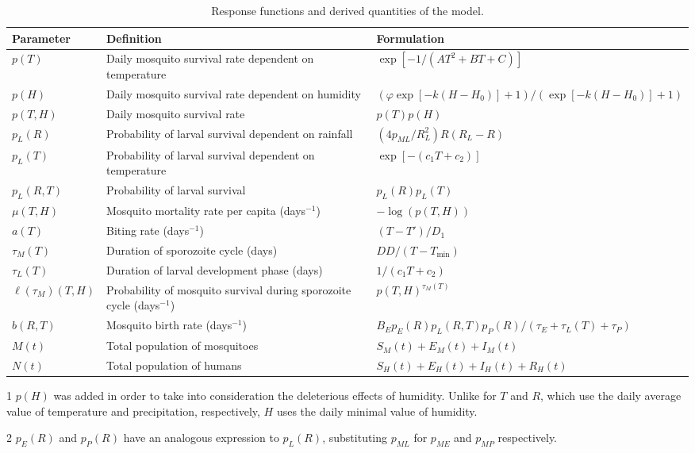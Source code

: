 \documentclass[a4paper,fleqn]{cas-dc}
\begin{document}
\begin{table}[width=2.0\linewidth,cols=3,pos=h]
\begin{threeparttable}
\caption{Response functions and derived quantities of the model.}\label{tbl1}
\renewcommand{\thetable}{A.1}  %
\begin{tabular*}{\tblwidth}{@{} LLL@{} }
\toprule
Parameter & Definition & Formulation\\
\midrule
$p(T)$  & Daily mosquito survival rate dependent on temperature  & $\exp\left[-1 / (AT^2 + BT + C)\right]$ \\  
$p(H)$  & Daily mosquito survival rate dependent on humidity  & $\left(\varphi\exp\left[-k(H-H_0)\right]+1\right)/\left(\exp\left[-k(H-H_0)\right]+1\right)$\\%
$p(T, H)$   & Daily mosquito survival rate   & $p(T)p(H)$ \\  
$p_L(R)$   & Probability of larval survival dependent on rainfall  & $({4p_{ML}}/{R_L^2})R(R_L - R)$  \\  
$p_L(T)$   & Probability of larval survival dependent on temperature   & $\exp\left[-(c_1T + c_2)\right]$  \\ 
$p_L(R, T)$   & Probability of larval survival   & $p_L(R)p_L(T)$   \\
$\mu(T, H)$   & Mosquito mortality rate per capita (days$^{-1}$)   & $-\log(p(T, H))$  \\ 
$a(T)$   & Biting rate (days$^{-1}$)  & ${(T - T')}/{D_1}$   \\ 
$\tau_M(T)$   & Duration of sporozoite cycle (days)   & ${DD}/{(T - T_{\min})}$   \\ 
$\tau_L(T)$   & Duration of larval development phase (days)   & ${1}/{(c_1T + c_2)}$  \\   
$\ell({\tau_M})(T,H)$   &  Probability of mosquito survival during sporozoite cycle (days$^{-1}$)  & $p(T,H)^{\tau_M(T)}$  \\ 
$b(R, T)$   & Mosquito birth rate (days$^{-1}$)   & ${B_E  p_E(R)  p_L(R,T)  p_P(R)}/{(\tau_E + \tau_L(T) + \tau_P)}$   \\ 
$M(t)$   &  Total population of mosquitoes  & $S_M(t) + E_M(t) + I_M(t)$   \\ 
$N(t)$   & Total population of humans   & $S_H(t) +E_H(t) + I_H(t) + R_H(t)$   \\ 
\bottomrule
\end{tabular*}
\begin{tablenotes}
\item[1] $p(H)$ was added in order to take into consideration the deleterious effects of humidity. Unlike for $T$ and $R$, which use the daily average value of temperature and precipitation, respectively, $H$ uses the daily minimal value of humidity.
\item[2] $p_E(R)$ and $p_P(R)$ have an analogous expression to $p_L(R)$, substituting $p_{ML}$ for $p_{ME}$ and $p_{MP}$ respectively.
\end{tablenotes}
\end{threeparttable}
\end{table}
\end{document}
